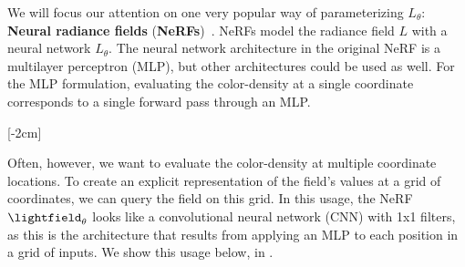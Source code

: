 We will focus our attention on one very popular way of parameterizing $L_{\theta}$: \textbf{Neural radiance fields} (\textbf{NeRFs})~\cite{mildenhall2020nerf}. NeRFs model the radiance field $L$ with a neural network $L_{\theta}$. 
The neural network architecture in the original NeRF is a multilayer perceptron (MLP), but other architectures could be used as well. For the MLP formulation, evaluating the color-density at a single 
coordinate corresponds to a single forward pass through an MLP. 

[-2cm]

Often, however, we want to evaluate the color-density at multiple coordinate locations. To create an explicit representation of the field's values at a grid of coordinates, we can query the field on this grid. In this usage, the NeRF $\lightfield_{\theta}$ looks like a convolutional neural network (CNN) with 1x1 filters, 
as this is the architecture that results from applying an MLP to each position in a grid of inputs. We show this usage below, in \fig{\ref{fig:nerfs:image_to_image_arch}}.%


